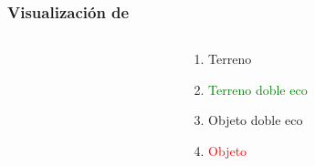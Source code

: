 \begin{frame}
 \frametitle{Visualización de \LARGE{}}
\begin{columns}
  \begin{column}{0.65\textwidth}
    \begin{center}
   \end{center}
  \end{column}
  \begin{column}{0.35\textwidth}
	\begin{enumerate}
	 \item \textcolor{yellow!95!black}{Terreno}
	 \item \textcolor{green}{Terreno doble eco}
	 \item \textcolor{blue!90!black}{Objeto doble eco}
	 \item \textcolor{red}{Objeto}
	\end{enumerate}
  \end{column}
\end{columns}
\end{frame}






